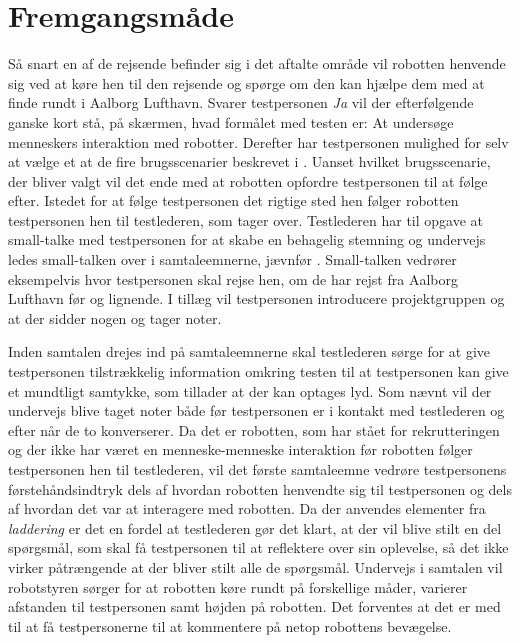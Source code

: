 \section{Fremgangsmåde}
\label{ParametreFremgangsmaade}
%
Så snart en af de rejsende befinder sig i det aftalte område vil robotten henvende sig ved at køre hen til den rejsende og spørge om den kan hjælpe dem med at finde rundt i Aalborg Lufthavn. Svarer testpersonen \textit{Ja} vil der efterfølgende ganske kort stå, på skærmen, hvad formålet med testen er: At undersøge menneskers interaktion med robotter. Derefter har testpersonen mulighed for selv at vælge et at de fire brugsscenarier beskrevet i . Uanset hvilket brugsscenarie, der bliver valgt vil det ende med at robotten opfordre testpersonen til at følge efter. Istedet for at følge testpersonen det rigtige sted hen følger robotten testpersonen hen til testlederen, som tager over. Testlederen har til opgave at small-talke med testpersonen for at skabe en behagelig stemning og undervejs ledes small-talken over i samtaleemnerne, jævnfør . Small-talken vedrører eksempelvis hvor testpersonen skal rejse hen, om de har rejst fra Aalborg Lufthavn før og lignende. I tillæg vil testpersonen introducere projektgruppen og at der sidder nogen og tager noter. 

Inden samtalen drejes ind på samtaleemnerne skal testlederen sørge for at give testpersonen tilstrækkelig information omkring testen til at testpersonen kan give et mundtligt samtykke, som tillader at der kan optages lyd. Som nævnt vil der undervejs blive taget noter både før testpersonen er i kontakt med testlederen og efter når de to konverserer. \blankline
%
Da det er robotten, som har stået for rekrutteringen og der ikke har været en menneske-menneske interaktion før robotten følger testpersonen hen til testlederen, vil det første samtaleemne vedrøre testpersonens førstehåndsindtryk dels af hvordan robotten henvendte sig til testpersonen og dels af hvordan det var at interagere med robotten. Da der anvendes elementer fra \textit{laddering} er det en fordel at testlederen gør det klart, at der vil blive stilt en del spørgsmål, som skal få testpersonen til at reflektere over sin oplevelse, så det ikke virker påtrængende at der bliver stilt alle de spørgsmål. Undervejs i samtalen vil robotstyren sørger for at robotten køre rundt på forskellige måder, varierer afstanden til testpersonen samt højden på robotten. Det forventes at det er med til at få testpersonerne til at kommentere på netop robottens bevægelse. 

